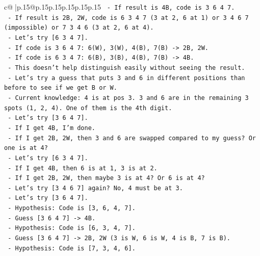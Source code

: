 \documentclass{article}
\begin{document}
{\begin{supertabular}{c@{$\;$}|p{.15\linewidth}@{}p{.15\linewidth}p{.15\linewidth}p{.15\linewidth}p{.15\linewidth}p{.15\linewidth}}
{{{\texttt{                    {-} If result is 4B, code is 3 6 4 7.} \\
\texttt{                    {-} If result is 2B, 2W, code is 6 3 4 7 (3 at 2, 6 at 1) or 3 4 6 7 (impossible) or 7 3 4 6 (3 at 2, 6 at 4).} \\
\texttt{                    {-} Let's try {[}6 3 4 7{]}.} \\
\texttt{                      {-} If code is 3 6 4 7: 6(W), 3(W), 4(B), 7(B) {-}> 2B, 2W.} \\
\texttt{                      {-} If code is 6 3 4 7: 6(B), 3(B), 4(B), 7(B) {-}> 4B.} \\
\texttt{                    {-} This doesn't help distinguish easily without seeing the result.} \\
\texttt{                    {-} Let's try a guess that puts 3 and 6 in different positions than before to see if we get B or W.} \\
\texttt{                    {-} Current knowledge: 4 is at pos 3. 3 and 6 are in the remaining 3 spots (1, 2, 4). One of them is the 4th digit.} \\
\texttt{                    {-} Let's try {[}3 6 4 7{]}.} \\
\texttt{                    {-} If I get 4B, I'm done.} \\
\texttt{                    {-} If I get 2B, 2W, then 3 and 6 are swapped compared to my guess? Or one is at 4?} \\
\texttt{                    {-} Let's try {[}6 3 4 7{]}.} \\
\texttt{                    {-} If I get 4B, then 6 is at 1, 3 is at 2.} \\
\texttt{                    {-} If I get 2B, 2W, then maybe 3 is at 4? Or 6 is at 4?} \\
\texttt{                    {-} Let's try {[}3 4 6 7{]} again? No, 4 must be at 3.} \\
\texttt{                    {-} Let's try {[}3 6 4 7{]}.} \\
\texttt{                    {-} Hypothesis: Code is {[}3, 6, 4, 7{]}.} \\
\texttt{                      {-} Guess {[}3 6 4 7{]} {-}> 4B.} \\
\texttt{                    {-} Hypothesis: Code is {[}6, 3, 4, 7{]}.} \\
\texttt{                      {-} Guess {[}3 6 4 7{]} {-}> 2B, 2W (3 is W, 6 is W, 4 is B, 7 is B).} \\
\texttt{                    {-} Hypothesis: Code is {[}7, 3, 4, 6{]}.} \\
}}}
\end{supertabular}}
\end{document}
